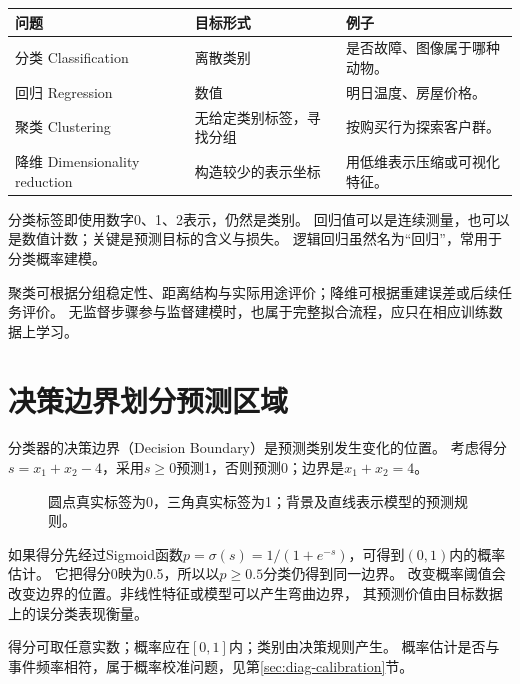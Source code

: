 \begin{center}
\begin{tabularx}{\textwidth}{P{28mm}P{40mm}Y}
\toprule
问题 & 目标形式 & 例子\\
\midrule
分类 Classification & 离散类别 & 是否故障、图像属于哪种动物。\\
回归 Regression & 数值 & 明日温度、房屋价格。\\
聚类 Clustering & 无给定类别标签，寻找分组 & 按购买行为探索客户群。\\
降维 Dimensionality reduction & 构造较少的表示坐标 & 用低维表示压缩或可视化特征。\\
\bottomrule
\end{tabularx}
\end{center}

分类标签即使用数字0、1、2表示，仍然是类别。
回归值可以是连续测量，也可以是数值计数；关键是预测目标的含义与损失。
逻辑回归虽然名为“回归”，常用于分类概率建模。

聚类可根据分组稳定性、距离结构与实际用途评价；降维可根据重建误差或后续任务评价。
无监督步骤参与监督建模时，也属于完整拟合流程，应只在相应训练数据上学习。

\section{决策边界划分预测区域}
\label{sec:learn-boundary}
分类器的决策边界（Decision Boundary）是预测类别发生变化的位置。
考虑得分$s=x_1+x_2-4$，采用$s\geq0$预测1，否则预测0；边界是$x_1+x_2=4$。

\begin{figure}[htbp]
\centering
\caption{圆点真实标签为0，三角真实标签为1；背景及直线表示模型的预测规则。}
\par\smallskip
{}
\end{figure}

如果得分先经过Sigmoid函数$p=\sigma(s)=1/(1+e^{-s})$，可得到$(0,1)$内的概率估计。
它把得分0映为0.5，所以以$p\geq0.5$分类仍得到同一边界。
改变概率阈值会改变边界的位置。非线性特征或模型可以产生弯曲边界，
其预测价值由目标数据上的误分类表现衡量。

\begin{pitfall}[类别、得分、概率是不同对象]
得分可取任意实数；概率应在$[0,1]$内；类别由决策规则产生。
概率估计是否与事件频率相符，属于概率校准问题，见第\ref{sec:diag-calibration}节。
\end{pitfall}

